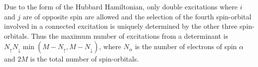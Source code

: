 \documentclass[a4paper, 11pt]{article}
\begin{document}
Due to the form of the Hubbard Hamiltonian, only double excitations where $i$ and $j$ are of opposite spin are allowed and the selection of the fourth spin-orbital involved in a connected excitation is uniquely determined by the other three spin-orbitals.  Thus the maximum number of excitations from a determinant is $N_\uparrow N_\downarrow \min( M - N_\uparrow, M - N_\downarrow)$, where $N_\alpha$ is the number of electrons of spin $\alpha$ and $2M$ is the total number of spin-orbitals.
\end{document}
